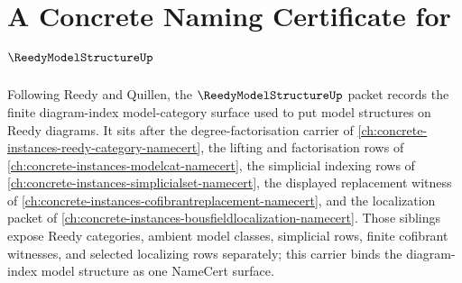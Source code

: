 \chapter{A Concrete Naming Certificate for $\ReedyModelStructureUp$}
\label{ch:concrete-instances-reedy-model-structure-namecert}

Following Reedy and Quillen, the $\ReedyModelStructureUp$ packet records the finite diagram-index model-category surface used to put model structures on Reedy diagrams. It sits after the degree-factorisation carrier of \autoref{ch:concrete-instances-reedy-category-namecert}, the lifting and factorisation rows of \autoref{ch:concrete-instances-modelcat-namecert}, the simplicial indexing rows of \autoref{ch:concrete-instances-simplicialset-namecert}, the displayed replacement witness of \autoref{ch:concrete-instances-cofibrantreplacement-namecert}, and the localization packet of \autoref{ch:concrete-instances-bousfieldlocalization-namecert}. Those siblings expose Reedy categories, ambient model classes, simplicial rows, finite cofibrant witnesses, and selected localizing rows separately; this carrier binds the diagram-index model structure as one NameCert surface.

